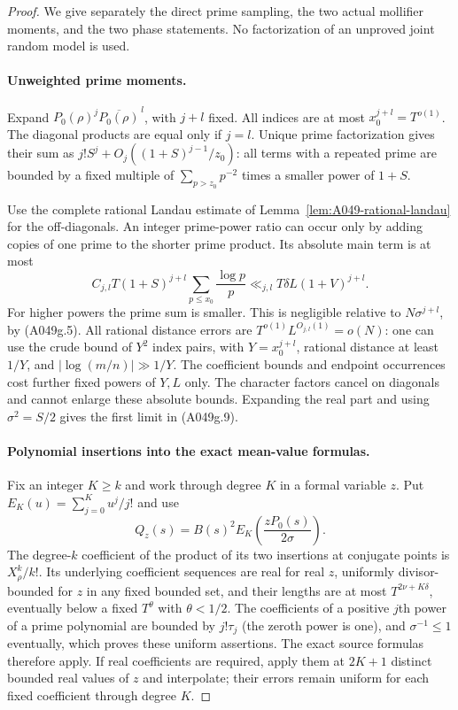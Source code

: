 \begin{proof}
We give separately the direct prime sampling, the two actual
mollifier moments, and the two phase statements. No factorization
of an unproved joint random model is used.

\paragraph{Unweighted prime moments.}
Expand $P_0(\rho)^j\overline{P_0(\rho)}^{\,l}$, with $j+l$
fixed. All indices are at most $x_0^{j+l}=T^{o(1)}$.
The diagonal products are equal only if $j=l$. Unique prime
factorization gives their sum as
$j!S^j+O_j((1+S)^{j-1}/z_0)$: all terms with a repeated prime
are bounded by a fixed multiple of
$\sum_{p>z_0}p^{-2}$ times a smaller power of $1+S$.

Use the complete rational Landau estimate of
Lemma~\ref{lem:A049-rational-landau} for the off-diagonals.
An integer prime-power ratio can occur only by adding copies
of one prime to the shorter prime product. Its absolute main
term is at most
\[
 C_{j,l}T(1+S)^{j+l}
                     \sum_{p\le x_0}\frac{\log p}{p}
       \ll_{j,l}T\delta L(1+V)^{j+l}.
\]
For higher powers the prime sum is smaller. This is negligible
relative to $N\sigma^{j+l}$, by (A049g.5). All rational
distance errors are $T^{o(1)}L^{O_{j,l}(1)}=o(N)$:
one can use the crude bound of $Y^2$ index pairs, with
$Y=x_0^{j+l}$, rational distance at least $1/Y$, and
$|\log(m/n)|\gg1/Y$. The coefficient bounds and endpoint
occurrences cost further fixed powers of $Y,L$ only.
The character factors cancel on diagonals and cannot enlarge
these absolute bounds. Expanding the real part and using
$\sigma^2=S/2$ gives the first limit in (A049g.9).

\paragraph{Polynomial insertions into the exact mean-value formulas.}
Fix an integer $K\ge k$ and work through degree $K$ in a formal
variable $z$. Put $E_K(u)=\sum_{j=0}^K u^j/j!$ and use
\[
 Q_z(s)=B(s)^2E_K\left(\frac{zP_0(s)}{2\sigma}\right).
\tag{A049g.12}
\]
The degree-$k$ coefficient of the product of its two insertions
at conjugate points is $X_\rho^k/k!$. Its underlying coefficient
sequences are real for real $z$, uniformly divisor-bounded for
$z$ in any fixed bounded set, and their lengths are at most
$T^{2\nu+K\delta}$, eventually below a fixed $T^\theta$ with
$\theta<1/2$. The coefficients of a positive $j$th power of a prime
polynomial are bounded by $j!\tau_j$ (the zeroth power is one),
and $\sigma^{-1}\le1$
eventually, which proves these uniform assertions. The exact
source formulas therefore apply. If real coefficients are
required, apply them at $2K+1$ distinct bounded real values of
$z$ and interpolate; their errors remain uniform for each fixed
coefficient through degree $K$.


\end{proof}
